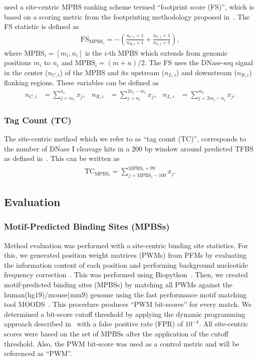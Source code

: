 \documentclass[11pt]{article}
\begin{document}
\cite{he2014} used a site-centric MPBS ranking scheme termed ``footprint score (FS)'', which is based on a scoring metric from the footprinting methodology proposed in~\cite{neph2012a}. The FS statistic is defined as
\begin{align}
\text{FS}_{\text{MPBS}_{i}} = -\left(\frac{{n}_{C,i}+1}{{n}_{R,i}+1} + \frac{{n}_{C,i}+1}{{n}_{L,i}+1}\right),
\label{eq:fs1}
\end{align}
where $\text{MPBS}_{i} = [{m}_{i},{n}_{i}]$ is the $i$-th MPBS which extends from genomic positions ${m}_{i}$ to ${n}_{i}$ and $\overline{\text{MPBS}_{i}} = (m+n)/2$. The FS uses the DNase-seq signal in the center (${n}_{C,i}$) of the MPBS and its upstream (${n}_{L,i}$) and downstream (${n}_{R,i}$) flanking regions. These variables can be defined as
\begin{align}
{n}_{C,i} &= \sum_{j={m}_{i}}^{{n}_{i}} {x}_{j}, &
{n}_{R,i} &= \sum_{j={n}_{i}}^{2{n}_{i}-{m}_{i}} {x}_{j}, &
{n}_{L,i} &= \sum_{j=2{m}_{i}-{n}_{i}}^{{m}_{i}} {x}_{j}.
\label{eq:fs2}
\end{align}

\subsubsection{Tag Count (TC)}
\label{sec:tc}

The site-centric method which we refer to as ``tag count (TC)'', corresponds to the number of DNase I cleavage hits in a $200$ bp window around predicted TFBS as defined in~\cite{he2014}. This can be written as
\begin{align}
\text{TC}_{\text{MPBS}_{i}} = \sum_{j=\overline{\text{MPBS}_{i}}-100}^{\overline{\text{MPBS}_{i}}+99} {x}_{j}.
\label{eq:tc}
\end{align}

\subsection{Evaluation}
\label{sec:evaluation}

\subsubsection{Motif-Predicted Binding Sites (MPBSs)}
\label{sec:mpbs}

Method evaluation was performed with a site-centric binding site statistics. For this, we generated position weight matrices (PWMs) from PFMs by evaluating the information content of each position and performing background nucleotide frequency correction~\citep{stormo2000}. This was performed using Biopython~\citep{cock2009}. Then, we created motif-predicted binding sites (MPBSs) by matching all PWMs against the human(hg19)/mouse(mm9) genome using the fast performance motif matching tool MOODS~\citep{korhonen2009}. This procedure produces ``PWM bit-scores'' for every match. We determined a bit-score cutoff threshold by applying the dynamic programming approach described in~\cite{wilczynski2009} with a false positive rate (FPR) of $10^{-4}$. All site-centric scores were based on the set of MPBSs after the application of the cutoff threshold. Also, the PWM bit-score was used as a control metric and will be referenced as ``PWM''.
\end{document}
